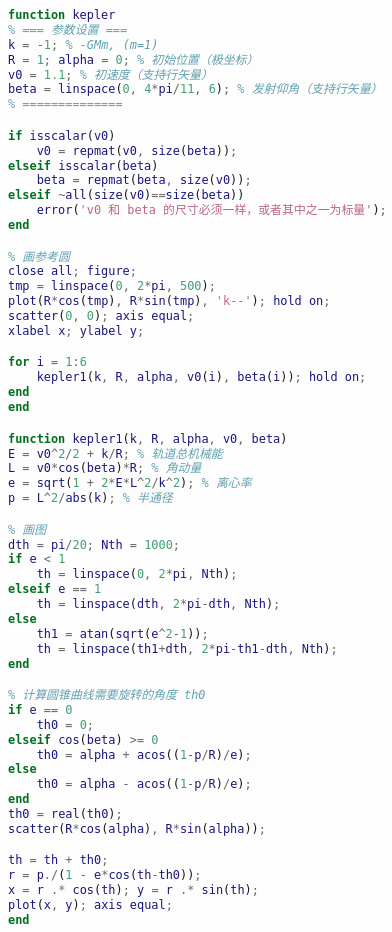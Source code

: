 \begin{lstlisting}[language=matlab]
% 已知初始位置、发射速度、发射方向， 求轨道以及运动方程
function kepler
% === 参数设置 ===
k = -1; % -GMm, (m=1)
R = 1; alpha = 0; % 初始位置（极坐标）
v0 = 1.1; % 初速度（支持行矢量）
beta = linspace(0, 4*pi/11, 6); % 发射仰角（支持行矢量）
% ==============

if isscalar(v0)
    v0 = repmat(v0, size(beta));
elseif isscalar(beta)
    beta = repmat(beta, size(v0));
elseif ~all(size(v0)==size(beta))
    error('v0 和 beta 的尺寸必须一样，或者其中之一为标量');
end

% 画参考圆
close all; figure;
tmp = linspace(0, 2*pi, 500);
plot(R*cos(tmp), R*sin(tmp), 'k--'); hold on;
scatter(0, 0); axis equal;
xlabel x; ylabel y;

for i = 1:6
    kepler1(k, R, alpha, v0(i), beta(i)); hold on;
end
end

function kepler1(k, R, alpha, v0, beta)
E = v0^2/2 + k/R; % 轨道总机械能
L = v0*cos(beta)*R; % 角动量
e = sqrt(1 + 2*E*L^2/k^2); % 离心率
p = L^2/abs(k); % 半通径

% 画图
dth = pi/20; Nth = 1000;
if e < 1
    th = linspace(0, 2*pi, Nth);
elseif e == 1
    th = linspace(dth, 2*pi-dth, Nth);
else
    th1 = atan(sqrt(e^2-1));
    th = linspace(th1+dth, 2*pi-th1-dth, Nth);
end

% 计算圆锥曲线需要旋转的角度 th0
if e == 0
    th0 = 0;
elseif cos(beta) >= 0
    th0 = alpha + acos((1-p/R)/e);
else
    th0 = alpha - acos((1-p/R)/e);
end
th0 = real(th0);
scatter(R*cos(alpha), R*sin(alpha));

th = th + th0;
r = p./(1 - e*cos(th-th0));
x = r .* cos(th); y = r .* sin(th);
plot(x, y); axis equal;
end
\end{lstlisting}
